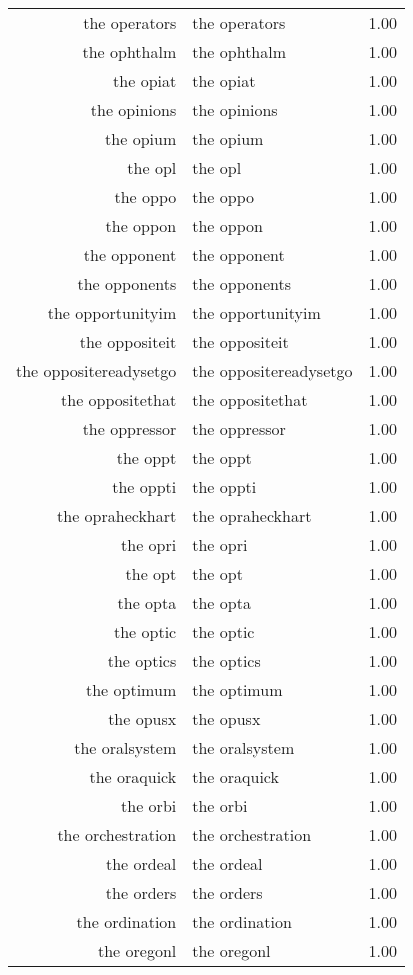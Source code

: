 \begin{table}[ht]
\begin{tabular}{rlr}
  the operators & the operators & 1.00 \\ 
  the ophthalm & the ophthalm & 1.00 \\ 
  the opiat & the opiat & 1.00 \\ 
  the opinions & the opinions & 1.00 \\ 
  the opium & the opium & 1.00 \\ 
  the opl & the opl & 1.00 \\ 
  the oppo & the oppo & 1.00 \\ 
  the oppon & the oppon & 1.00 \\ 
  the opponent & the opponent & 1.00 \\ 
  the opponents & the opponents & 1.00 \\ 
  the opportunityim & the opportunityim & 1.00 \\ 
  the oppositeit & the oppositeit & 1.00 \\ 
  the oppositereadysetgo & the oppositereadysetgo & 1.00 \\ 
  the oppositethat & the oppositethat & 1.00 \\ 
  the oppressor & the oppressor & 1.00 \\ 
  the oppt & the oppt & 1.00 \\ 
  the oppti & the oppti & 1.00 \\ 
  the opraheckhart & the opraheckhart & 1.00 \\ 
  the opri & the opri & 1.00 \\ 
  the opt & the opt & 1.00 \\ 
  the opta & the opta & 1.00 \\ 
  the optic & the optic & 1.00 \\ 
  the optics & the optics & 1.00 \\ 
  the optimum & the optimum & 1.00 \\ 
  the opusx & the opusx & 1.00 \\ 
  the oralsystem & the oralsystem & 1.00 \\ 
  the oraquick & the oraquick & 1.00 \\ 
  the orbi & the orbi & 1.00 \\ 
  the orchestration & the orchestration & 1.00 \\ 
  the ordeal & the ordeal & 1.00 \\ 
  the orders & the orders & 1.00 \\ 
  the ordination & the ordination & 1.00 \\ 
  the oregonl & the oregonl & 1.00 \\ 

\end{tabular}
\end{table}
